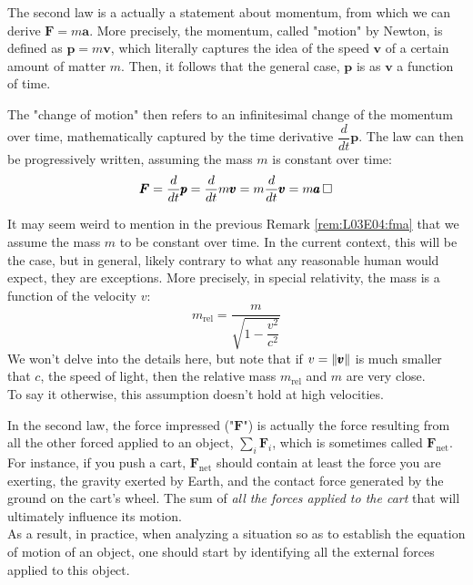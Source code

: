 \documentclass[solutions.tex]{subfiles}
\renewcommand{\bm}[1]{\pmb{#1}}
\renewcommand{\qed}{\,\relax\ifmmode\Box\else$\Box$\fi}
\begin{document}
\begin{remark}\label{rem:L03E04:fma} The second law is a actually a statement
about momentum, from which we can derive $\bm{F}=m\bm{a}$.
More precisely, the momentum, called "motion" by Newton,
is defined as $\bm{p} = m\bm{v}$, which literally captures the idea of
the speed $\bm{v}$ of a certain amount of matter $m$. Then, it follows
that the general case, $\bm{p}$ is as $\bm{v}$ a function of time.

The "change of motion" then refers to an infinitesimal change of
the momentum over time, mathematically captured by the time derivative
$\dfrac{d}{dt}\bm{p}$. The law can then
be progressively written, assuming the mass $m$ is constant over time:
\[
	\bm{F} = \frac{d}{dt}\bm{p}
	= \frac{d}{dt}m\bm{v}
	= m\frac{d}{dt}\bm{v}
	= m\bm{a}\qed
\]
\end{remark}

\begin{remark}\label{rem:L03E04:relmass} It may seem weird to mention
in the previous Remark \ref{rem:L03E04:fma} that we assume the mass $m$
to be constant over time. In the current context, this will be the case,
but in general, likely contrary to what any reasonable human would expect,
they are exceptions. More precisely,
in special relativity, the mass is a function of the velocity $v$:
\[
	m_{\text{rel}} = \frac{m}{\sqrt{1-\dfrac{v^2}{c^2}}}
\]
We won't delve into the details here, but note that if $v=\norm{\bm{v}}$
is much smaller that $c$, the speed of light, then the relative
mass $m_{\text{rel}}$ and $m$ are very close.\\

To say it otherwise, this assumption doesn't hold at high velocities.
\end{remark}

\begin{remark} In the second law, the force impressed ("$\bm{F}$") is
actually the force resulting from all the other forced applied to an
object, $\sum_i\bm{F}_i$, which is sometimes called $\bm{F}_\text{net}$. \\

For instance, if you push a cart, $\bm{F}_\text{net}$ should contain
at least the force you are exerting, the gravity exerted by Earth, and
the contact force generated by the ground on the cart's wheel.
The sum of \textit{all the forces applied to the cart} that will
ultimately influence its motion. \\

As a result, in practice, when analyzing a situation so as to establish
the equation of motion of an object, one should start by identifying
all the external forces applied to this object.
\end{remark}
\end{document}
